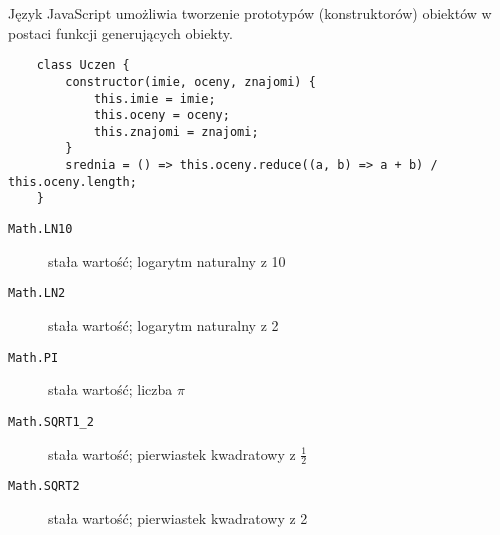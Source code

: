 \documentclass[a4paper]{article}
\begin{document}
Język JavaScript umożliwia tworzenie prototypów (konstruktorów) obiektów w postaci funkcji generujących obiekty.
\begin{verbatim}
    class Uczen {
        constructor(imie, oceny, znajomi) {
            this.imie = imie;
            this.oceny = oceny;
            this.znajomi = znajomi;
        }
        srednia = () => this.oceny.reduce((a, b) => a + b) / this.oceny.length;
    }
\end{verbatim}
\begin{description}
    \item[\texttt{Math.LN10}] stała wartość; logarytm naturalny z 10
    \item[\texttt{Math.LN2}] stała wartość; logarytm naturalny z 2
    \item[\texttt{Math.PI}] stała wartość; liczba $\pi$
    \item[\texttt{Math.SQRT1_2}] stała wartość; pierwiastek kwadratowy z $\frac{1}{2}$
    \item[\texttt{Math.SQRT2}] stała wartość; pierwiastek kwadratowy z 2   
\end{description}
\end{document}
